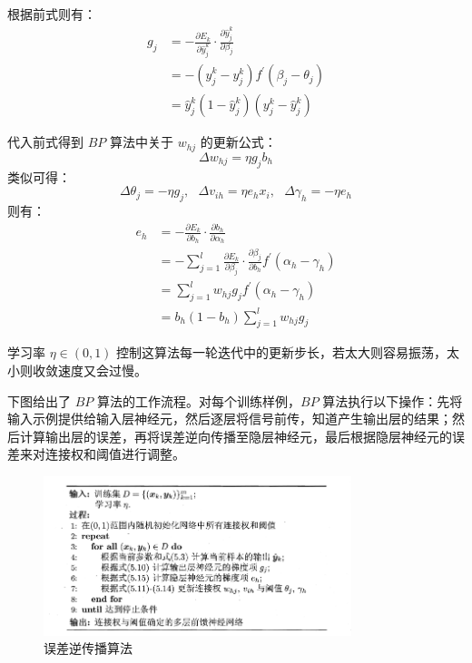 \documentclass[12pt, a4paper]{article} %
\begin{document}
根据前式则有：
\begin{equation*}
    \begin{array}{*{20}{l}}
        {g_j}&{\displaystyle = - \frac{\partial E_k}{\partial \hat{y}_j^k} \cdot \frac{\partial \hat{y}_j^k}{\partial \beta_j} }\\
        {}&{ = - (\hat{y}_j^k - y_j^k) f^{\prime} (\beta_j - \theta_j) } \\
        {}&{= \hat{y}_j^k (1 - \hat{y}_j^k) (y_j^k - \hat{y}_j^k)}
    \end{array}
\end{equation*}

代入前式得到 $BP$ 算法中关于 $w_{hj}$ 的更新公式：
\begin{equation*}
    \Delta w_{hj} = \eta g_j b_h
\end{equation*}
类似可得：
\begin{equation*}
    \Delta \theta_{j} = - \eta g_j, \ \ \ \Delta v_{ih} = \eta e_h x_i, \ \ \ \Delta \gamma_h = - \eta e_h
\end{equation*}
则有：
\begin{equation*}
    \begin{array}{*{20}{l}}
        {e_h}&{\displaystyle  = - \frac{\partial E_k}{\partial b_h} \cdot \frac{\partial b_h}{\partial \alpha_h} }\\
        {}&{\displaystyle  = - \sum_{j = 1}^{l} \frac{\partial E_k}{\partial \beta_j} \cdot \frac{\partial \beta_j}{\partial b_h} f^{\prime} (\alpha_h - \gamma_h)} \\
        {}&{\displaystyle  = \sum_{j = 1}^{l} w_{hj} g_{j} f^{\prime} (\alpha_h - \gamma_h) } \\
        {}&{\displaystyle  = b_h (1 - b_h) \sum_{j = 1}^{l} w_{hj} g_{j} }
    \end{array}
\end{equation*}

学习率 $\eta \in (0, 1)$ 控制这算法每一轮迭代中的更新步长，若太大则容易振荡，太小则收敛速度又会过慢。

下图给出了 $BP$ 算法的工作流程。对每个训练样例，$BP$ 算法执行以下操作：先将输入示例提供给输入层神经元，然后逐层将信号前传，知道产生输出层的结果；然后计算输出层的误差，再将误差逆向传播至隐层神经元，最后根据隐层神经元的误差来对连接权和阈值进行调整。

\begin{figure}[H]
    \centering
    \includegraphics[width=0.8\textwidth]{../img/5-7-误差逆传播算法.png}
    \caption{误差逆传播算法}
    \label{fig:误差逆传播算法}
\end{figure}
\end{document}
